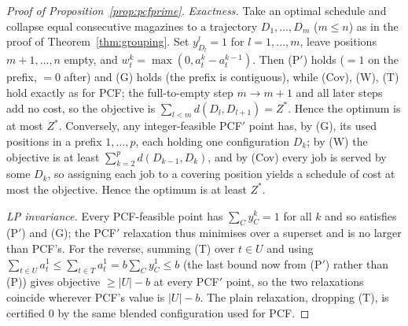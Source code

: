 \documentclass[11pt,a4paper]{article}
\theoremstyle{plain}
\theoremstyle{definition}
\theoremstyle{remark}
\newcommand{\U}{U}
\newcommand{\Zst}{Z^{\ast}}
\begin{document}
\begin{proof}[Proof of Proposition~\ref{prop:pcfprime}]
\emph{Exactness.} Take an optimal schedule and collapse equal consecutive magazines to
a trajectory $D_1,\dots,D_m$ ($m\le n$) as in the proof of Theorem~\ref{thm:grouping}.
Set $y^{l}_{D_l}=1$ for $l=1,\dots,m$, leave positions $m{+}1,\dots,n$ empty, and
$w_t^{k}=\max(0,a_t^{k}-a_t^{k-1})$. Then (P$'$) holds ($=1$ on the prefix, $=0$ after)
and (G) holds (the prefix is contiguous), while (Cov), (W), (T) hold exactly as for
PCF; the full-to-empty step $m\to m{+}1$ and all later steps add no cost, so the
objective is $\sum_{l<m}d(D_l,D_{l+1})=\Zst$. Hence the optimum is at most $\Zst$.
Conversely, any integer-feasible PCF$'$ point has, by (G), its used positions in a
prefix $1,\dots,p$, each holding one configuration $D_k$; by (W) the objective is at
least $\sum_{k=2}^{p}d(D_{k-1},D_k)$, and by (Cov) every job is served by some $D_k$,
so assigning each job to a covering position yields a schedule of cost at most the
objective. Hence the optimum is at least $\Zst$.

\emph{LP invariance.} Every PCF-feasible point has $\sum_C y_C^{k}=1$ for all $k$ and so
satisfies (P$'$) and (G); the PCF$'$ relaxation thus minimises over a superset and is
no larger than PCF's. For the reverse, summing (T) over $t\in\U$ and using
$\sum_{t\in\U}a_t^{1}\le\sum_{t\in T}a_t^{1}=b\sum_C y_C^{1}\le b$ (the last bound now
from (P$'$) rather than (P)) gives objective $\ge\lvert\U\rvert-b$ at every PCF$'$
point, so the two relaxations coincide wherever PCF's value is $\lvert\U\rvert-b$. The
plain relaxation, dropping (T), is certified $0$ by the same blended configuration used
for PCF.
\end{proof}



\end{document}
